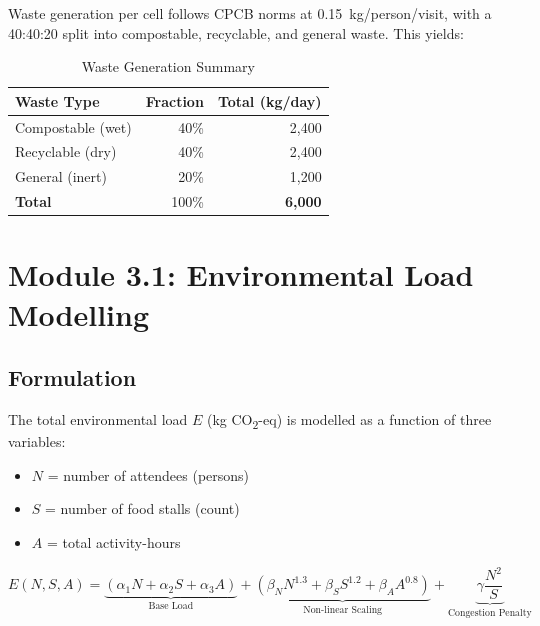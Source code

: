 \documentclass[11pt,a4paper]{article}
\begin{document}
Waste generation per cell follows CPCB norms at 0.15~kg/person/visit, with a 40:40:20 split into compostable, recyclable, and general waste. This yields:

\begin{table}[H]
\centering
\caption{Waste Generation Summary}
\begin{tabular}{lrr}
\toprule
\textbf{Waste Type} & \textbf{Fraction} & \textbf{Total (kg/day)} \\ \midrule
Compostable (wet) & 40\% & 2,400 \\
Recyclable (dry)  & 40\% & 2,400 \\
General (inert)   & 20\% & 1,200 \\
\midrule
\textbf{Total}    & 100\% & \textbf{6,000} \\
\bottomrule
\end{tabular}
\end{table}

\section{Module 3.1: Environmental Load Modelling}
\label{sec:mod31}

\subsection{Formulation}

The total environmental load $E$ (kg CO\textsubscript{2}-eq) is modelled as a function of three variables:

\begin{itemize}
    \item $N$ = number of attendees (persons)
    \item $S$ = number of food stalls (count)
    \item $A$ = total activity-hours
\end{itemize}

\begin{equation}
    E(N, S, A) = \underbrace{(\alpha_1 N + \alpha_2 S + \alpha_3 A)}_{\text{Base Load}} + \underbrace{(\beta_N N^{1.3} + \beta_S S^{1.2} + \beta_A A^{0.8})}_{\text{Non-linear Scaling}} + \underbrace{\gamma \frac{N^2}{S}}_{\text{Congestion Penalty}}
\end{equation}
\end{document}
